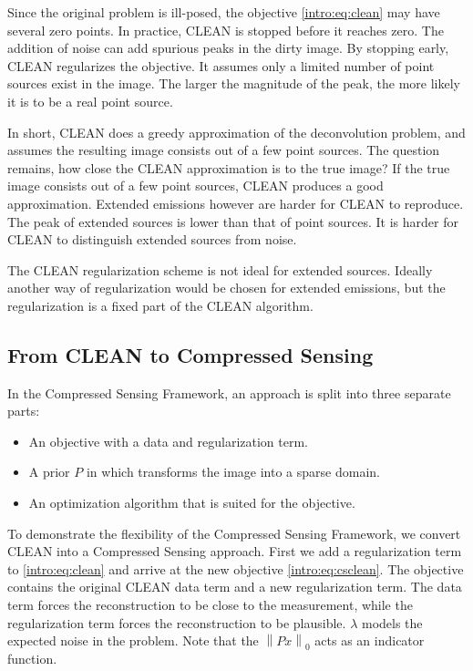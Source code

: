 Since the original problem is ill-posed, the objective \eqref{intro:eq:clean} may have several zero points. In practice, CLEAN is stopped before it reaches zero. The addition of noise can add spurious peaks in the dirty image. By stopping early, CLEAN regularizes the objective. It assumes only a limited number of point sources exist in the image. The larger the magnitude of the peak, the more likely it is to be a real point source.

In short, CLEAN does a greedy approximation of the deconvolution problem, and assumes the resulting image consists out of a few point sources. The question remains, how close the CLEAN approximation is to the true image? If the true image consists out of a few point sources, CLEAN produces a good approximation. Extended emissions however are harder for CLEAN to reproduce. The peak of extended sources is lower than that of point sources. It is harder for CLEAN to distinguish extended sources from noise.

The CLEAN regularization scheme is not ideal for extended sources. Ideally another way of regularization would be chosen for extended emissions, but the regularization is a fixed part of the CLEAN algorithm.


\subsection{From CLEAN to Compressed Sensing}
In the Compressed Sensing Framework, an approach is split into three separate parts:
\begin{itemize}
	\item An objective with a data and regularization term.
	\item A prior $P$ in which transforms the image into a sparse domain.
	\item An optimization algorithm that is suited for the objective.
\end{itemize}

To demonstrate the flexibility of the Compressed Sensing Framework, we convert CLEAN into a Compressed Sensing approach. First we add a regularization term to \eqref{intro:eq:clean} and arrive at the new objective \eqref{intro:eq:csclean}. The objective contains the original CLEAN data term and a new regularization term. The data term forces the reconstruction to be close to the measurement, while the regularization term forces the reconstruction to be plausible. $\lambda$ models the expected noise in the problem. Note that the $\left \| Px \right \|_0$ acts as an indicator function. 

